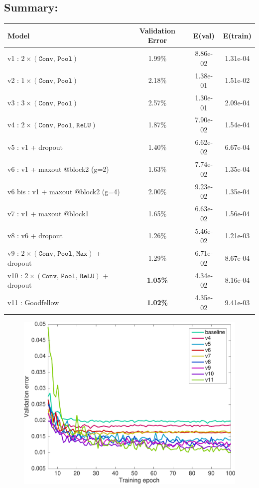 \documentclass[11pt]{article}
\begin{document}
\subsection{Summary:}
	\begin{savenotes}
	\begin{table}[H]
	\centering
	\begin{tabular}{|l|c|c||c|}
		\hline
		Model & Validation Error & E(val)  & E(train)\footnotemark\\ 
		\hline
		v1 : $2\times(\texttt{Conv, Pool})$ & 1.99\% & 8.86e-02 & 1.31e-04 \\
		v2 : $1\times(\texttt{Conv, Pool})$ & 2.18\% & 1.38e-01 & 1.51e-02 \\
		v3 : $3\times(\texttt{Conv, Pool})$ & 2.57\% & 1.30e-01 & 2.09e-04 \\
		v4 : $2\times(\texttt{Conv, Pool, ReLU})$ & 1.87\% & 7.90e-02 & 1.54e-04\\
		v5 : v1 + dropout  & 1.40\% & 6.62e-02 & 6.67e-04 \\
		v6 : v1 + maxout @block2 (g=2)& 1.63\% & 7.74e-02 & 1.35e-04 \\
		v6 bis : v1 + maxout @block2 (g=4) & 2.00\% & 9.23e-02 & 1.35e-04 \\
		v7 : v1 + maxout @block1 & 1.65\% & 6.63e-02 & 1.56e-04\\
		v8 : v6 + dropout & 1.26\% & 5.46e-02 & 1.21e-03 \\
		v9 : $2\times(\texttt{Conv, Pool, Max})$ + dropout & 1.29\% & 6.71e-02 & 8.67e-04 \\
		v10 : $2\times(\texttt{Conv, Pool, ReLU})$ + dropout & \textcolor{BrickRed}{\bf1.05\%} & 4.34e-02 & 8.16e-04\\
		v11 : Goodfellow & \textcolor{BrickRed}{\bf1.02\%} & 4.35e-02 & 9.41e-03\\ 
		\hline
	\end{tabular}
	\end{table}
	\end{savenotes}
	\begin{figure}[H]
	    \centering
	    \includegraphics[width=12cm]{recap}
	    \caption{}
	\end{figure}
\end{document}

